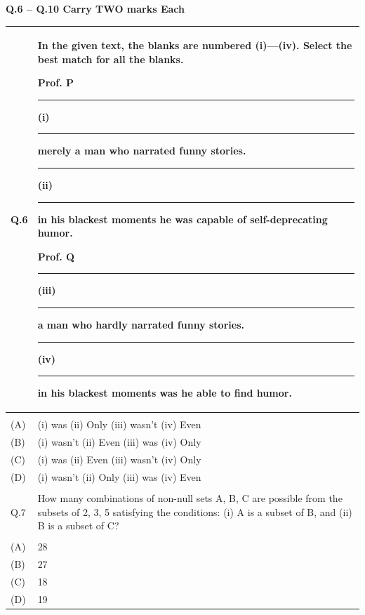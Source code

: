 \documentclass[12pt]{article}
\begin{document}
\newpage

\textbf{Q.6 – Q.10 Carry TWO marks Each}


\begin{table}[H]
\renewcommand{\arraystretch}{2.8}
\setlength{\tabcolsep}{8pt}
\begin{tabular}{|l|p{15cm}|}
\hline
Q.6 &In the given text, the blanks are numbered (i)---(iv). Select the best match for all the
blanks.

Prof. P \rule{0.5cm}{0.15mm}(i)\rule{0.5cm}{0.15mm} merely a man who narrated funny stories. \rule{0.5cm}{0.15mm}(ii)\rule{0.5cm}{0.15mm} in his blackest moments he was capable of self-deprecating humor.

Prof. Q \rule{0.5cm}{0.15mm}(iii)\rule{0.5cm}{0.15mm} a man who hardly narrated funny stories. \rule{0.5cm}{0.15mm}(iv)\rule{0.5cm}{0.15mm} in his blackest moments was he able to find humor.
 \\ \hline
 & \\ \hline
(A)& (i) was (ii) Only (iii) wasn’t (iv) Even \\ \hline
(B)&(i) wasn't (ii) Even (iii) was (iv) Only\\ \hline
(C)&(i) was (ii) Even (iii) wasn't (iv) Only \\ \hline
(D)&(i) wasn't (ii) Only (iii) was (iv) Even\\ \hline
 & \\ \hline


Q.7 & How many combinations of non-null sets A, B, C are possible from the subsets of
{2, 3, 5} satisfying the conditions: (i) A is a subset of B, and (ii) B is a subset of C? \\ \hline
 & \\ \hline
(A)&28\\ \hline
(B)&27\\ \hline
(C)&18 \\ \hline
(D)&19\\ \hline
\end{tabular}
\end{table}

\newpage
\end{document}

